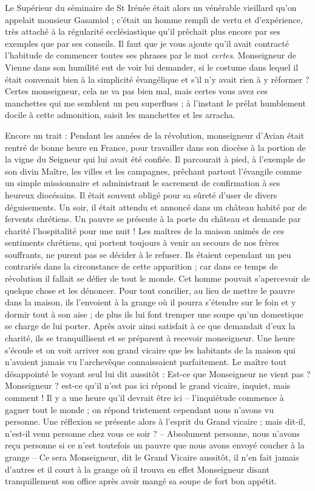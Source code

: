 \documentclass[11pt,a4paper]{report}
\begin{document}
Le Supérieur du séminaire de St Irénée était alors un vénérable vieillard qu'on appelait monsieur Gasamiol ; c'était un homme rempli de vertu et d'expérience, très attaché à la régularité ecclésiastique qu'il prêchait plus encore par ses exemples que par ses conseils. Il faut que je vous ajoute qu'il avait contracté l'habitude de commencer toutes ses phrases par le mot \textit{certes}. Monseigneur de Vienne dans son humilité eut de voir lui demander, si le costume dans lequel il était convenait bien à la simplicité évangélique et s'il n'y avait rien à y réformer ? Certes monseigneur, cela ne va pas bien mal, mais certes vous avez ces manchettes qui me semblent un peu superflues ; à l'instant le prélat humblement docile à cette admonition, saisit les manchettes et les arracha.

Encore un trait : Pendant les années de la révolution, monseigneur d'Avian était rentré de bonne heure en France, pour travailler dans son diocèse à la portion de la vigne du Seigneur qui lui avait été confiée. Il parcourait à pied, à l'exemple de son divin Maître, les villes et les campagnes, prêchant partout l'évangile comme un simple missionnaire et administrant le sacrement de confirmation à ses heureux diocésains. Il était souvent obligé pour sa sûreté d'user de divers déguisements. Un soir, il était attendu et annoncé dans un château habité par de fervents chrétiens. Un pauvre se présente à la porte du château et demande par charité l'hospitalité pour une nuit ! Les maîtres de la maison animés de ces sentiments chrétiens, qui portent toujours à venir au secours de nos frères souffrants, ne purent pas se décider à le refuser. Ils étaient cependant un peu contrariés dans la circonstance de cette apparition ; car dans ce temps de révolution il fallait se défier de tout le monde. Cet homme pouvait s'apercevoir de quelque chose et les dénoncer. Pour tout concilier, au lieu de mettre le pauvre dans la maison, ils l'envoient à la grange où il pourra s'étendre sur le foin et y dormir tout à son aise ; de plus ils lui font tremper une soupe qu'un domestique se charge de lui porter. Après avoir ainsi satisfait à ce que demandait d'eux la charité, ils se tranquillisent et se préparent à recevoir monseigneur. Une heure s'écoule et on voit arriver son grand vicaire que les habitants de la maison qui n'avaient jamais vu l'archevêque connaissaient parfaitement. Le maître tout désappointé le voyant seul lui dit aussitôt : Est-ce que Monseigneur ne vient pas ? Monseigneur ? est-ce qu'il n'est pas ici répond le grand vicaire, inquiet, mais comment ! Il y a une heure qu'il devrait être ici -- l'inquiétude commence à gagner tout le monde ; on répond tristement cependant nous n'avons vu personne. Une réflexion se présente alors à l'esprit du Grand vicaire ; mais dit-il, n'est-il venu personne chez vous ce soir ? -- Absolument personne, nous n'avons reçu personne si ce n'est toutefois un pauvre que nous avons envoyé coucher à la grange -- Ce sera Monseigneur, dit le Grand Vicaire aussitôt, il n'en fait jamais d'autres et il court à la grange où il trouva en effet Monseigneur disant tranquillement son office après avoir mangé sa soupe de fort bon appétit.
\end{document}
